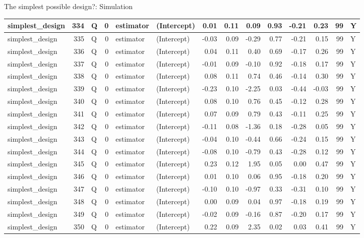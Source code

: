 \documentclass[
  11pt,
  ignorenonframetext,
]{beamer}
\begin{document}
\begin{frame}[fragile]{The simplest possible design?: Simulation}
\begin{tabular}{l|r|l|r|l|l|r|r|r|r|r|r|r|l}
\hline
simplest\_design & 334 & Q & 0 & estimator & (Intercept) & 0.01 & 0.11 & 0.09 & 0.93 & -0.21 & 0.23 & 99 & Y\\
\hline
simplest\_design & 335 & Q & 0 & estimator & (Intercept) & -0.03 & 0.09 & -0.29 & 0.77 & -0.21 & 0.15 & 99 & Y\\
\hline
simplest\_design & 336 & Q & 0 & estimator & (Intercept) & 0.04 & 0.11 & 0.40 & 0.69 & -0.17 & 0.26 & 99 & Y\\
\hline
simplest\_design & 337 & Q & 0 & estimator & (Intercept) & -0.01 & 0.09 & -0.10 & 0.92 & -0.18 & 0.17 & 99 & Y\\
\hline
simplest\_design & 338 & Q & 0 & estimator & (Intercept) & 0.08 & 0.11 & 0.74 & 0.46 & -0.14 & 0.30 & 99 & Y\\
\hline
simplest\_design & 339 & Q & 0 & estimator & (Intercept) & -0.23 & 0.10 & -2.25 & 0.03 & -0.44 & -0.03 & 99 & Y\\
\hline
simplest\_design & 340 & Q & 0 & estimator & (Intercept) & 0.08 & 0.10 & 0.76 & 0.45 & -0.12 & 0.28 & 99 & Y\\
\hline
simplest\_design & 341 & Q & 0 & estimator & (Intercept) & 0.07 & 0.09 & 0.79 & 0.43 & -0.11 & 0.25 & 99 & Y\\
\hline
simplest\_design & 342 & Q & 0 & estimator & (Intercept) & -0.11 & 0.08 & -1.36 & 0.18 & -0.28 & 0.05 & 99 & Y\\
\hline
simplest\_design & 343 & Q & 0 & estimator & (Intercept) & -0.04 & 0.10 & -0.44 & 0.66 & -0.24 & 0.15 & 99 & Y\\
\hline
simplest\_design & 344 & Q & 0 & estimator & (Intercept) & -0.08 & 0.10 & -0.79 & 0.43 & -0.28 & 0.12 & 99 & Y\\
\hline
simplest\_design & 345 & Q & 0 & estimator & (Intercept) & 0.23 & 0.12 & 1.95 & 0.05 & 0.00 & 0.47 & 99 & Y\\
\hline
simplest\_design & 346 & Q & 0 & estimator & (Intercept) & 0.01 & 0.10 & 0.06 & 0.95 & -0.18 & 0.20 & 99 & Y\\
\hline
simplest\_design & 347 & Q & 0 & estimator & (Intercept) & -0.10 & 0.10 & -0.97 & 0.33 & -0.31 & 0.10 & 99 & Y\\
\hline
simplest\_design & 348 & Q & 0 & estimator & (Intercept) & 0.00 & 0.09 & 0.04 & 0.97 & -0.18 & 0.19 & 99 & Y\\
\hline
simplest\_design & 349 & Q & 0 & estimator & (Intercept) & -0.02 & 0.09 & -0.16 & 0.87 & -0.20 & 0.17 & 99 & Y\\
\hline
simplest\_design & 350 & Q & 0 & estimator & (Intercept) & 0.22 & 0.09 & 2.35 & 0.02 & 0.03 & 0.41 & 99 & Y\\

\end{tabular}
\end{frame}
\end{document}
